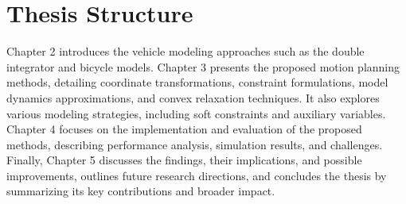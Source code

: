 \section{Thesis Structure} \label{sec:thesis_structure}
Chapter 2 introduces the vehicle modeling approaches such as the double integrator and bicycle models.
Chapter 3 presents the proposed motion planning methods, detailing coordinate transformations, constraint formulations, model dynamics
approximations, and convex relaxation techniques.
It also explores various modeling strategies, including soft constraints and auxiliary variables.
Chapter 4 focuses on the implementation and evaluation of the proposed methods, describing performance analysis, simulation results, and challenges.
Finally, Chapter 5 discusses the findings, their implications, and possible improvements, outlines future research directions, and concludes the
thesis by summarizing its key contributions and broader impact.
